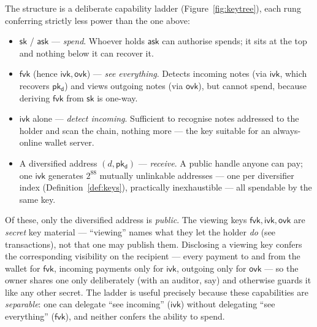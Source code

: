 \documentclass[11pt,a4paper]{article}
\theoremstyle{definition}
\newcommand{\ask}{\ensuremath{\mathsf{ask}}}
\newcommand{\ivk}{\ensuremath{\mathsf{ivk}}}
\newcommand{\fvk}{\ensuremath{\mathsf{fvk}}}
\newcommand{\ovk}{\ensuremath{\mathsf{ovk}}}
\newcommand{\pkd}{\ensuremath{\mathsf{pk_d}}}
\begin{document}
The structure is a deliberate capability ladder (Figure~\ref{fig:keytree}),
each rung conferring strictly less power than the one above:

\begin{itemize}[leftmargin=*]
\item $\mathsf{sk}$ / $\ask$ --- \emph{spend}. Whoever holds $\ask$ can
authorise spends; it sits at the top and nothing below it can recover it.
\item $\fvk$ (hence $\ivk, \ovk$) --- \emph{see everything}. Detects
incoming notes (via $\ivk$, which recovers $\pkd$) and views outgoing notes
(via $\ovk$), but cannot spend, because deriving $\fvk$ from
$\mathsf{sk}$ is one-way.
\item $\ivk$ alone --- \emph{detect incoming}. Sufficient to recognise notes
addressed to the holder and scan the chain, nothing more --- the key suitable
for an always-online wallet server.
\item A diversified address $(d, \pkd)$ --- \emph{receive}. A public
handle anyone can pay; one $\ivk$ generates $2^{88}$ mutually unlinkable
addresses --- one per diversifier index (Definition~\ref{def:keys}),
practically inexhaustible --- all spendable by the same key.
\end{itemize}

Of these, only the diversified address is
\emph{public}. The viewing keys $\fvk, \ivk, \ovk$ are \emph{secret} key
material --- ``viewing'' names what they let the holder \emph{do} (see
transactions), not that one may publish them. Disclosing a viewing key
confers the corresponding visibility on the recipient --- every payment to
and from the wallet for $\fvk$, incoming payments only for $\ivk$,
outgoing only for $\ovk$ --- so the owner shares one only deliberately
(with an auditor, say) and otherwise guards it like any other secret. The ladder is useful precisely
because these capabilities are \emph{separable}: one can delegate
``see incoming'' ($\ivk$) without delegating ``see everything'' ($\fvk$),
and neither confers the ability to spend.
\end{document}
